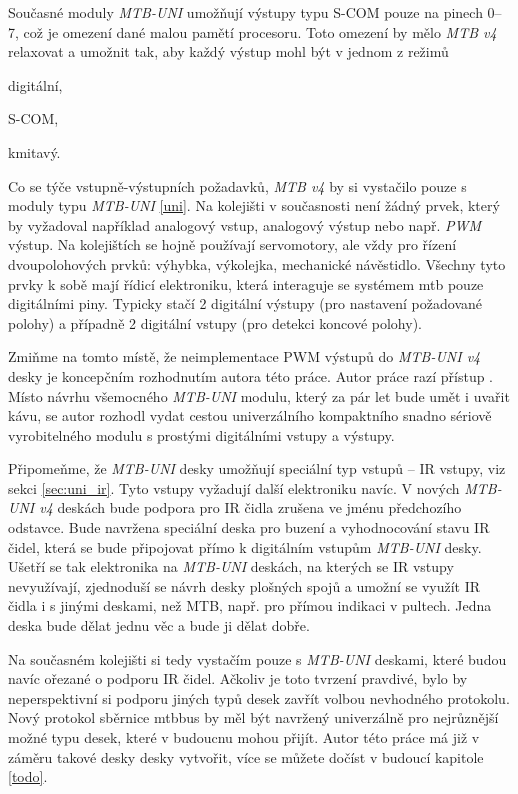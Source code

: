 Současné moduly \textit{MTB-UNI} umožňují výstupy typu S-COM pouze na pinech
0–7, což je omezení dané malou pamětí procesoru. Toto omezení by mělo
\textit{MTB v4} relaxovat a umožnit tak, aby každý výstup mohl být v jednom
z režimů

\begin{compactenum}
\item digitální,
\item S-COM,
\item kmitavý.
\end{compactenum}

Co se týče vstupně-výstupních požadavků, \textit{MTB v4} by si vystačilo pouze
s moduly typu \textit{MTB-UNI} \ref{uni}. Na kolejišti v současnosti není žádný
prvek, který by vyžadoval například analogový vstup, analogový výstup nebo např.
\textit{PWM} výstup. Na kolejištích se hojně používají servomotory, ale vždy
pro řízení dvoupolohových prvků: výhybka, výkolejka, mechanické návěstidlo.
Všechny tyto prvky k sobě mají řídicí elektroniku, která interaguje se systémem
\gls{mtb} pouze digitálními piny. Typicky stačí 2 digitální výstupy (pro
nastavení požadované polohy) a případně 2 digitální vstupy (pro detekci koncové
polohy).

Zmiňme na tomto místě, že neimplementace PWM výstupů do \textit{MTB-UNI v4}
desky je koncepčním rozhodnutím autora této práce. Autor práce razí přístup
. Místo návrhu všemocného
\textit{MTB-UNI} modulu, který za pár let bude umět i uvařit kávu, se autor
rozhodl vydat cestou univerzálního kompaktního snadno sériově vyrobitelného
modulu s prostými digitálními vstupy a výstupy.

Připomeňme, že \textit{MTB-UNI} desky umožňují speciální typ vstupů – IR vstupy,
viz sekci \ref{sec:uni_ir}. Tyto vstupy vyžadují další elektroniku navíc.
V nových \textit{MTB-UNI v4} deskách bude podpora pro IR čidla zrušena ve jménu
předchozího odstavce. Bude navržena speciální deska pro buzení a vyhodnocování
stavu IR čidel, která se bude připojovat přímo k digitálním vstupům
\textit{MTB-UNI} desky. Ušetří se tak elektronika na \textit{MTB-UNI} deskách,
na kterých se IR vstupy nevyužívají, zjednoduší se návrh desky plošných spojů
a umožní se využít IR čidla i s jinými deskami, než MTB, např. pro přímou
indikaci v pultech. Jedna deska bude dělat jednu věc a bude ji dělat dobře.

Na současném kolejišti si tedy vystačím pouze s \textit{MTB-UNI} deskami, které
budou navíc ořezané o podporu IR čidel. Ačkoliv je toto tvrzení pravdivé, bylo
by neperspektivní si podporu jiných typů desek zavřít volbou nevhodného
protokolu. Nový protokol sběrnice \gls{mtbbus} by měl být navržený univerzálně
pro nejrůznější možné typu desek, které v budoucnu mohou přijít. Autor této
práce má již v záměru takové desky desky vytvořit, více se můžete dočíst
v budoucí kapitole \ref{todo}.
